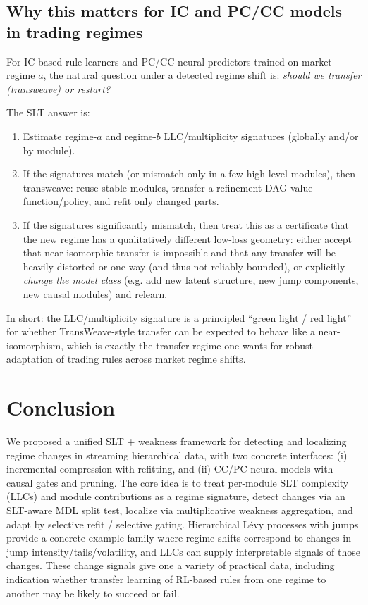 \documentclass[11pt]{article}
\begin{document}
\subsection{Why this matters for IC and PC/CC models in trading regimes}
For IC-based rule learners and PC/CC neural predictors trained on market regime $a$, the natural
question under a detected regime shift is: \emph{should we transfer (transweave) or restart?}

The SLT answer is:
\begin{enumerate}
\item Estimate regime-$a$ and regime-$b$ LLC/multiplicity signatures (globally and/or by module).
\item If the signatures match (or mismatch only in a few high-level modules), then transweave:
reuse stable modules, transfer a refinement-DAG value function/policy, and refit only changed parts.
\item If the signatures significantly mismatch, then treat this as a certificate that the new regime
has a qualitatively different low-loss geometry: either accept that near-isomorphic transfer is impossible and that
any transfer will be heavily distorted or one-way (and thus not reliably bounded), or explicitly \emph{change the model class}
(e.g. add new latent structure, new jump components, new causal modules) and relearn.
\end{enumerate}

In short: the LLC/multiplicity signature is a principled ``green light / red light'' for whether
TransWeave-style transfer can be expected to behave like a near-isomorphism, which is exactly the
transfer regime one wants for robust adaptation of trading rules across market regime shifts.


\section{Conclusion}
We proposed a unified SLT + weakness framework for detecting and localizing regime changes in streaming
hierarchical data, with two concrete interfaces:
(i) incremental compression with refitting, and (ii) CC/PC neural models with causal gates and pruning.
The core idea is to treat per-module SLT complexity (LLCs) and module contributions as a regime signature,
detect changes via an SLT-aware MDL split test, localize via multiplicative weakness aggregation, and adapt by
selective refit / selective gating. Hierarchical L\'evy processes with jumps provide a concrete example family
where regime shifts correspond to changes in jump intensity/tails/volatility, and LLCs can supply interpretable
signals of those changes.   These change signals give one a variety of practical data, including indication whether transfer learning of RL-based rules from one regime to another may be likely to succeed or fail.
\end{document}
